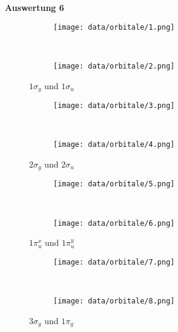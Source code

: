 \documentclass[12pt]{article}
\begin{document}
\begin{onehalfspace}
\textbf{Auswertung 6}
\begin{figure}[!hptb]
    \centering
    \begin{subfigure}[b]{0.4\textwidth}
        \texttt{[image: data/orbitale/1.png]}
    \end{subfigure}
    ~ %
    \begin{subfigure}[b]{0.4\textwidth}
        \texttt{[image: data/orbitale/2.png]}
    \end{subfigure}
    \caption{$1 \sigma _g$  und $1 \sigma _u$ }
\end{figure}

\begin{figure}[!hptb]
    \centering
    \begin{subfigure}[b]{0.4\textwidth}
        \texttt{[image: data/orbitale/3.png]}
    \end{subfigure}
    ~ %
    \begin{subfigure}[b]{0.4\textwidth}
        \texttt{[image: data/orbitale/4.png]}
    \end{subfigure}
    \caption{$2 \sigma _g$ und $2 \sigma _u$ }
\end{figure}

\begin{figure}[!hptb]
    \centering
    \begin{subfigure}[b]{0.4\textwidth}
        \texttt{[image: data/orbitale/5.png]}
    \end{subfigure}
    ~ %
    \begin{subfigure}[b]{0.4\textwidth}
        \texttt{[image: data/orbitale/6.png]}
    \end{subfigure}
     \caption{$1 \pi _u^x$ und $1 \pi _u^y$ }
\end{figure}
\newpage
\begin{figure}[!hptb]
    \centering
    \begin{subfigure}[b]{0.4\textwidth}
        \texttt{[image: data/orbitale/7.png]}
    \end{subfigure}
    ~ %
    \begin{subfigure}[b]{0.4\textwidth}
        \texttt{[image: data/orbitale/8.png]}
    \end{subfigure}
       \caption{$3 \sigma _g$ und $1 \pi _g$}
\end{figure}


\end{onehalfspace}
\end{document}
